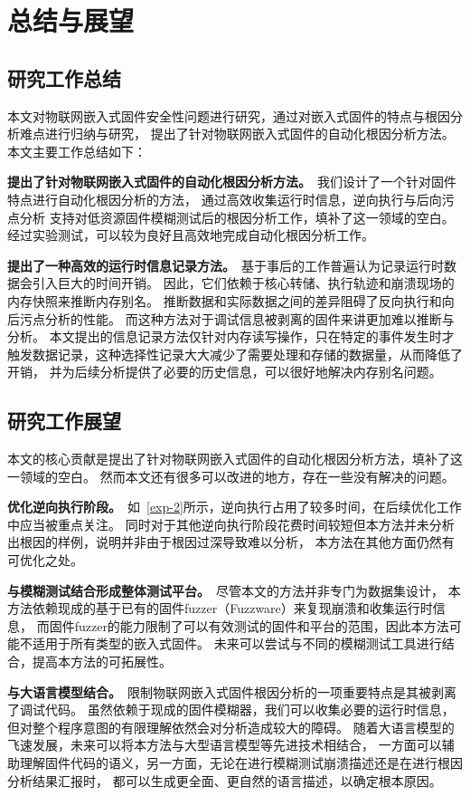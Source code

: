 \section{总结与展望}        %
\subsection{研究工作总结}
本文对物联网嵌入式固件安全性问题进行研究，通过对嵌入式固件的特点与根因分析难点进行归纳与研究，
提出了针对物联网嵌入式固件的自动化根因分析方法。本文主要工作总结如下：

\textbf{提出了针对物联网嵌入式固件的自动化根因分析方法。}\ 我们设计了一个针对固件特点进行自动化根因分析的方法，
通过高效收集运行时信息，逆向执行与后向污点分析
支持对低资源固件模糊测试后的根因分析工作，填补了这一领域的空白。
经过实验测试，可以较为良好且高效地完成自动化根因分析工作。

\textbf{提出了一种高效的运行时信息记录方法。}\ 基于事后的工作普遍认为记录运行时数据会引入巨大的时间开销。
因此，它们依赖于核心转储、执行轨迹和崩溃现场的内存快照来推断内存别名。
推断数据和实际数据之间的差异阻碍了反向执行和向后污点分析的性能。
而这种方法对于调试信息被剥离的固件来讲更加难以推断与分析。
本文提出的信息记录方法仅针对内存读写操作，只在特定的事件发生时才触发数据记录，这种选择性记录大大减少了需要处理和存储的数据量，从而降低了开销，
并为后续分析提供了必要的历史信息，可以很好地解决内存别名问题。


\subsection{研究工作展望}
本文的核心贡献是提出了针对物联网嵌入式固件的自动化根因分析方法，填补了这一领域的空白。
然而本文还有很多可以改进的地方，存在一些没有解决的问题。


\textbf{优化逆向执行阶段。}\ 如~\autoref{exp-2}所示，逆向执行占用了较多时间，在后续优化工作中应当被重点关注。
同时对于其他逆向执行阶段花费时间较短但本方法并未分析出根因的样例，说明并非由于根因过深导致难以分析，
本方法在其他方面仍然有可优化之处。

\textbf{与模糊测试结合形成整体测试平台。}\ 尽管本文的方法并非专门为数据集设计，
本方法依赖现成的基于已有的固件fuzzer（Fuzzware）来复现崩溃和收集运行时信息，
而固件fuzzer的能力限制了可以有效测试的固件和平台的范围，因此本方法可能不适用于所有类型的嵌入式固件。
未来可以尝试与不同的模糊测试工具进行结合，提高本方法的可拓展性。


\textbf{与大语言模型结合。}\ 限制物联网嵌入式固件根因分析的一项重要特点是其被剥离了调试代码。
虽然依赖于现成的固件模糊器，我们可以收集必要的运行时信息，但对整个程序意图的有限理解依然会对分析造成较大的障碍。
随着大语言模型的飞速发展，未来可以将本方法与大型语言模型等先进技术相结合，
一方面可以辅助理解固件代码的语义，另一方面，无论在进行模糊测试崩溃描述还是在进行根因分析结果汇报时，
都可以生成更全面、更自然的语言描述，以确定根本原因。
